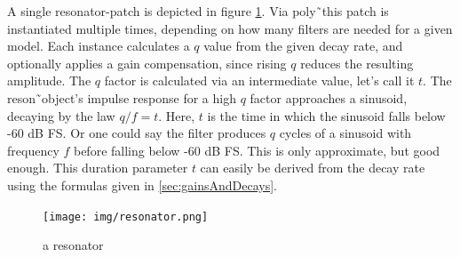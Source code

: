 A single resonator-patch is depicted in figure \ref{fig:reson}. Via poly\~\ this patch is instantiated multiple times, depending on how many filters are needed for a given model. Each instance calculates a \(q\) value from the given decay rate, and optionally applies a gain compensation, since rising \(q\) reduces the resulting amplitude. The \(q\) factor is calculated via an intermediate value, let's call it \(t\). The reson\~\ object's impulse response for a high \(q\) factor approaches a sinusoid, decaying by the law \(q/f=t\). Here, \(t\) is the time in which the sinusoid falls below -60 dB FS. Or one could say the filter produces \(q\) cycles of a sinusoid with frequency \(f\) before falling below -60 dB FS. This is only approximate, but good enough. This duration parameter \(t\) can easily be derived from the decay rate using the formulas given in \ref{sec:gainsAndDecays}. 

 \begin{figure}[h]
 	\begin{center}
 		\texttt{[image: img/resonator.png]}
 		\caption{a resonator}
 		\label{fig:reson}
 	\end{center}
 \end{figure}
 
 




